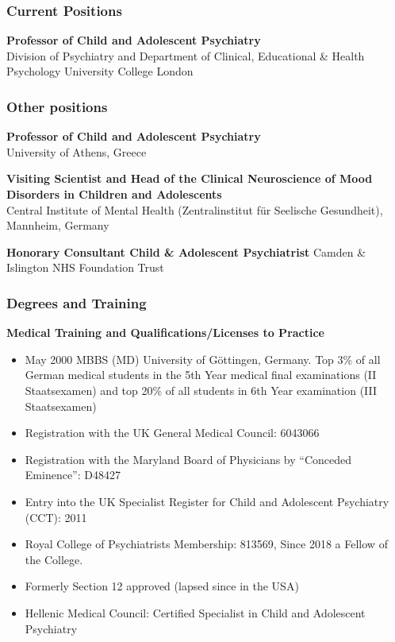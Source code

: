 \documentclass[
]{article}
\begin{document}
\hypertarget{current-positions}{%
\subsubsection{Current Positions}\label{current-positions}}

\textbf{Professor of Child and Adolescent Psychiatry}\\
Division of Psychiatry and Department of Clinical, Educational \& Health
Psychology University College London

\hypertarget{other-positions}{%
\subsubsection{Other positions}\label{other-positions}}

\textbf{Professor of Child and Adolescent Psychiatry}\\
University of Athens, Greece

\textbf{Visiting Scientist and Head of the Clinical Neuroscience of Mood
Disorders in Children and Adolescents}\\
Central Institute of Mental Health (Zentralinstitut für Seelische
Gesundheit), Mannheim, Germany

\textbf{Honorary Consultant Child \& Adolescent Psychiatrist} Camden \&
Islington NHS Foundation Trust

\hypertarget{degrees-and-training}{%
\subsubsection{Degrees and Training}\label{degrees-and-training}}

\textbf{Medical Training and Qualifications/Licenses to Practice}

\begin{itemize}
\item
  May 2000 MBBS (MD) University of Göttingen, Germany. Top 3\% of all
  German medical students in the 5th Year medical final examinations (II
  Staatsexamen) and top 20\% of all students in 6th Year examination
  (III Staatsexamen)
\item
  Registration with the UK General Medical Council: 6043066
\item
  Registration with the Maryland Board of Physicians by ``Conceded
  Eminence'': D48427
\item
  Entry into the UK Specialist Register for Child and Adolescent
  Psychiatry (CCT): 2011
\item
  Royal College of Psychiatrists Membership: 813569, Since 2018 a Fellow
  of the College.
\item
  Formerly Section 12 approved (lapsed since in the USA)
\item
  Hellenic Medical Council: Certified Specialist in Child and Adolescent
  Psychiatry
\end{itemize}
\end{document}
